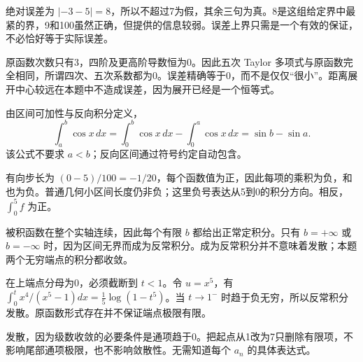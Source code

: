 \documentclass[UTF8,12pt,a4paper,fontset=fandol]{ctexart}
\begin{document}
\begin{solve}\label{ans:c45q5}
绝对误差为 $|-3-5|=8$，所以不超过7为假，其余三句为真。8是这组给定界中最紧的界，9和100虽然正确，但提供的信息较弱。误差上界只需是一个有效的保证，不必恰好等于实际误差。
\end{solve}

\begin{solve}\label{ans:c45q6}
原函数次数只有3，四阶及更高阶导数恒为0。因此五次 Taylor 多项式与原函数完全相同，所谓四次、五次系数都为0。误差精确等于0，而不是仅仅“很小”。距离展开中心较远在本题中不造成误差，因为展开已经是一个恒等式。
\end{solve}

\begin{solve}\label{ans:c45q7}
由区间可加性与反向积分定义，\[\int_a^b\cos x\,dx=\int_0^b\cos x\,dx-\int_0^a\cos x\,dx=\sin b-\sin a.\]该公式不要求 $a<b$；反向区间通过符号约定自动包含。
\end{solve}

\begin{solve}\label{ans:c45q8}
有向步长为 $(0-5)/100=-1/20$，每个函数值为正，因此每项的乘积为负，和也为负。普通几何小区间长度仍非负；这里负号表达从5到0的积分方向。相反，$\int_0^5f$ 为正。
\end{solve}

\begin{solve}\label{ans:c45q9}
被积函数在整个实轴连续，因此每个有限 $b$ 都给出正常定积分。只有 $b=+\infty$ 或 $b=-\infty$ 时，因为区间无界而成为反常积分。成为反常积分并不意味着发散；本题两个无穷端点的积分都收敛。
\end{solve}

\begin{solve}\label{ans:c45q10}
在上端点分母为0，必须截断到 $t<1$。令 $u=x^5$，有 $\int_0^t x^4/(x^5-1)dx=\frac15\log(1-t^5)$。当 $t\to1^-$ 时趋于负无穷，所以反常积分发散。原函数形式存在并不保证端点极限有限。
\end{solve}

\begin{solve}\label{ans:c45q11}
发散，因为级数收敛的必要条件是通项趋于0。把起点从1改为7只删除有限项，不影响尾部通项极限，也不影响敛散性。无需知道每个 $a_n$ 的具体表达式。
\end{solve}
\end{document}
